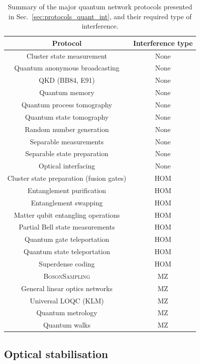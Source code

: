 \startnormtable
\begin{table}[!htbp]
	\begin{tabular}{|c|c|}
		\hline
  		\rowcolor{Dandelion} Protocol & Interference type \\
  		\hline
  		\hline
  		\rowcolor{LimeGreen} Cluster state measurement & None \\
   		\rowcolor{LimeGreen} Quantum anonymous broadcasting & None \\
  		\rowcolor{LimeGreen} QKD (BB84, E91) & None \\
  		\rowcolor{LimeGreen} Quantum memory & None \\
  		\rowcolor{LimeGreen} Quantum process tomography & None \\
  		\rowcolor{LimeGreen} Quantum state tomography & None \\
  		\rowcolor{LimeGreen} Random number generation & None \\
  		\rowcolor{LimeGreen} Separable measurements & None \\
  		\rowcolor{LimeGreen} Separable state preparation & None \\
  		\rowcolor{LimeGreen} Optical interfacing & None \\
  		\hline
  		\rowcolor{Apricot} Cluster state preparation (fusion gates) & HOM \\
  		\rowcolor{Apricot} Entanglement purification & HOM \\
  		\rowcolor{Apricot} Entanglement swapping & HOM \\ 
  		\rowcolor{Apricot} Matter qubit entangling operations & HOM \\
  		\rowcolor{Apricot} Partial Bell state measurements & HOM \\
   		\rowcolor{Apricot} Quantum gate teleportation & HOM \\
  		\rowcolor{Apricot} Quantum state teleportation & HOM \\
  		\rowcolor{Apricot} Superdense coding & HOM \\
  		\hline
  		\rowcolor{Lavender} \textsc{BosonSampling} & MZ \\
  		\rowcolor{Lavender} General linear optics networks & MZ \\
  		\rowcolor{Lavender} Universal LOQC (KLM) & MZ \\
  		\rowcolor{Lavender} Quantum metrology & MZ \\
  		\rowcolor{Lavender} Quantum walks & MZ \\
    	\hline
	\end{tabular}
	\captionspacetab \caption{Summary of the major quantum network protocols presented in Sec.~\ref{sec:protocols_quant_int}, and their required type of interference.}\label{table:summary_inter}
\end{table}

%
%

\subsection{Optical stabilisation} 



